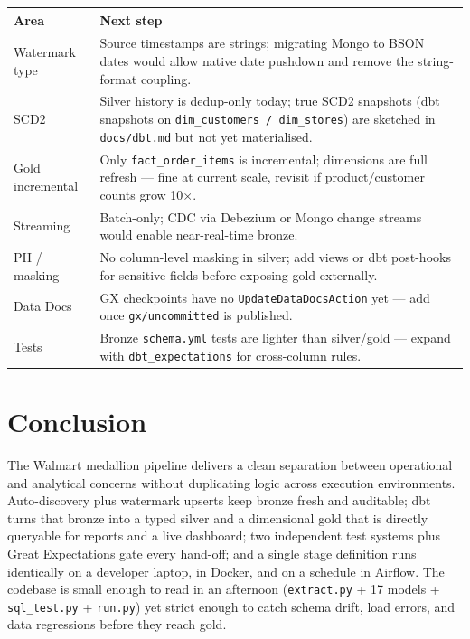\documentclass[11pt,a4paper]{article}
\begin{document}
\begin{center}
\begin{longtable}{p{4.2cm} p{10.6cm}}
\toprule
Area & Next step \\
\midrule
\endhead
Watermark type & Source timestamps are strings; migrating Mongo to BSON dates would allow native date pushdown and remove the string-format coupling. \\
SCD2 & Silver history is dedup-only today; true SCD2 snapshots (dbt snapshots on \texttt{dim\_customers / dim\_stores}) are sketched in \texttt{docs/dbt.md} but not yet materialised. \\
Gold incremental & Only \texttt{fact\_order\_items} is incremental; dimensions are full refresh — fine at current scale, revisit if product/customer counts grow 10$\times$. \\
Streaming & Batch-only; CDC via Debezium or Mongo change streams would enable near-real-time bronze. \\
PII / masking & No column-level masking in silver; add views or dbt post-hooks for sensitive fields before exposing gold externally. \\
Data Docs & GX checkpoints have no \texttt{UpdateDataDocsAction} yet — add once \texttt{gx/uncommitted} is published. \\
Tests & Bronze \texttt{schema.yml} tests are lighter than silver/gold — expand with \texttt{dbt\_expectations} for cross-column rules. \\
\bottomrule
\end{longtable}
\end{center}

\section{Conclusion}

The Walmart medallion pipeline delivers a clean separation between operational and analytical concerns without duplicating logic across execution environments. Auto-discovery plus watermark upserts keep bronze fresh and auditable; dbt turns that bronze into a typed silver and a dimensional gold that is directly queryable for reports and a live dashboard; two independent test systems plus Great Expectations gate every hand-off; and a single stage definition runs identically on a developer laptop, in Docker, and on a schedule in Airflow. The codebase is small enough to read in an afternoon (\texttt{extract.py} + 17 models + \texttt{sql\_test.py} + \texttt{run.py}) yet strict enough to catch schema drift, load errors, and data regressions before they reach gold.
\end{document}
